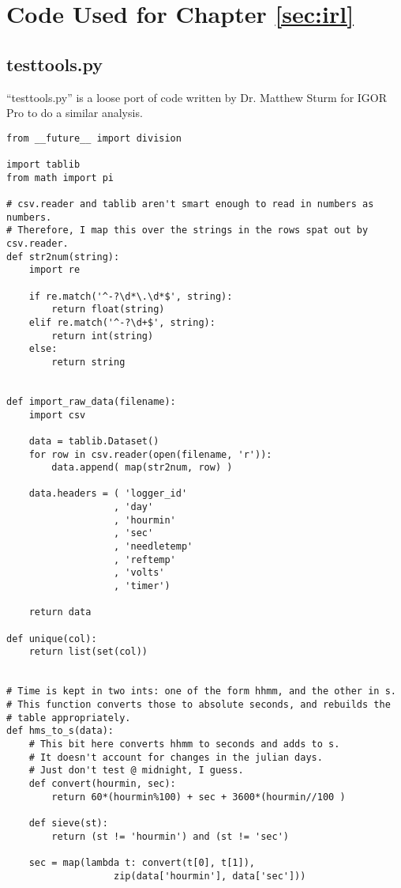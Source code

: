 \chapter{Code Used for Chapter \ref{sec:irl}}
\label{apx:irl}

\section{testtools.py}

``testtools.py'' is a loose port of code written by Dr. Matthew Sturm for
IGOR Pro to do a similar analysis.

\small
\begin{verbatim}
from __future__ import division

import tablib
from math import pi

# csv.reader and tablib aren't smart enough to read in numbers as numbers.
# Therefore, I map this over the strings in the rows spat out by csv.reader.
def str2num(string):
    import re

    if re.match('^-?\d*\.\d*$', string):
        return float(string)
    elif re.match('^-?\d+$', string):
        return int(string)
    else:
        return string


def import_raw_data(filename):
    import csv

    data = tablib.Dataset()
    for row in csv.reader(open(filename, 'r')):
        data.append( map(str2num, row) )

    data.headers = ( 'logger_id'
                   , 'day'
                   , 'hourmin'
                   , 'sec'
                   , 'needletemp'
                   , 'reftemp'
                   , 'volts'
                   , 'timer')

    return data

def unique(col):
    return list(set(col))


# Time is kept in two ints: one of the form hhmm, and the other in s.
# This function converts those to absolute seconds, and rebuilds the
# table appropriately.
def hms_to_s(data):
    # This bit here converts hhmm to seconds and adds to s.
    # It doesn't account for changes in the julian days.
    # Just don't test @ midnight, I guess.
    def convert(hourmin, sec):
        return 60*(hourmin%100) + sec + 3600*(hourmin//100 )

    def sieve(st):
        return (st != 'hourmin') and (st != 'sec')

    sec = map(lambda t: convert(t[0], t[1]), 
                   zip(data['hourmin'], data['sec']))


\end{verbatim}
